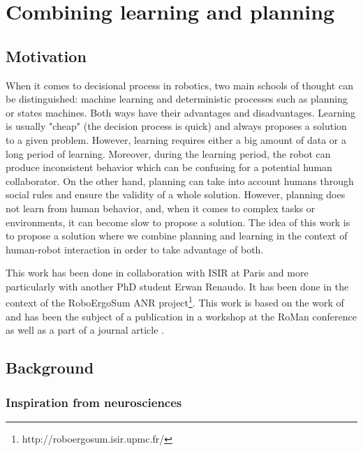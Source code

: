 \documentclass[english,a4paper,11pt,twoside]{StyleThese}
\begin{document}
\setcounter{chapter}{6} %
\dominitoc
\faketableofcontents
\fi

\chapter{Combining learning and planning}
\minitoc

\label{ch:Learning}

\section{Motivation}

When it comes to decisional process in robotics, two main schools of thought can be distinguished: machine learning and deterministic processes such as planning or states machines. Both ways have their advantages and disadvantages. Learning is usually "cheap" (the decision process is quick) and always proposes a solution to a given problem. However, learning requires either a big amount of data or a long period of learning. Moreover, during the learning period, the robot can produce inconsistent behavior which can be confusing for a potential human collaborator. On the other hand, planning can take into account humans through social rules and ensure the validity of a whole solution. However, planning does not learn from human behavior, and, when it comes to complex tasks or environments, it can become slow to propose a solution. The idea of this work is to propose a solution where we combine planning and learning in the context of human-robot interaction in order to take advantage of both. 

This work has been done in collaboration with ISIR at Paris and more particularly with another PhD student Erwan Renaudo. It has been done in the context of the RoboErgoSum ANR project\footnote{http://roboergosum.isir.upmc.fr/}. This work is based on the work of \cite{renaudo2014design} and has been the subject of a publication in a workshop at the RoMan conference \cite{renaudo2015learning} as well as a part of a journal article \cite{khamassi2016integration}.

\section{Background}

\subsection{Inspiration from neurosciences}
\end{document}
